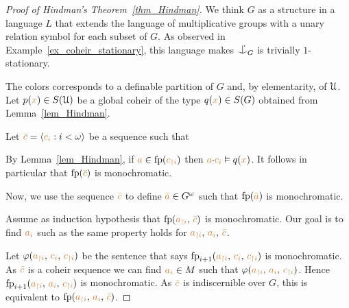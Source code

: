 \documentclass[creche.tex]{subfiles}
\begin{document}
\begin{proof}[Proof of Hindman's Theorem~\ref{thm_Hindman}]
We think $G$ as a structure in a language $L$ that extends the language of multiplicative groups with a unary relation symbol for each subset of $G$. As observed in Example~\ref{ex_coheir_stationary}, this language makes $\nonforkc_G$ is trivially $1$-stationary.

The colors corresponds to a definable partition of $G$ and, by elementarity, of $\EuScript U$.
Let $p({\color{brown} x})\in S(\EuScript U)$ be a global coheir of the type $q({\color{brown} x})\in S(G)$ obtained from Lemma~\ref{lem_Hindman}.

Let ${\color{brown}\bar c}=\langle{\color{brown}c_i}:i<\omega\rangle$ be a sequence such that


By Lemma~\ref{lem_Hindman}, if ${\color{brown} a}\in {\rm fp}({\color{brown} c_{\restriction i}})$ then ${\color{brown} a}{\cdot}{\color{brown} c_i}\vDash q({\color{brown} x})$.
It follows in particular that ${\rm fp}({\color{brown}\bar c})$ is monochromatic.


Now, we use the sequence ${\color{brown}\bar c}$ to define ${\color{brown}\bar a}\in G^\omega$ such that ${\rm fp}({\color{brown}\bar a})$ is monochromatic.

Assume as induction hypothesis that ${\rm fp}({\color{brown} a_{\restriction i}},\,{\color{brown}\bar c})$ is monochromatic.
Our goal is to find ${\color{brown} a_i}$ such as the same property holds for ${\color{brown} a_{\restriction i}},\,{\color{brown} a_i},\,{\color{brown}\bar c}$.


Let $\varphi({\color{brown} a_{\restriction i}},\,{\color{brown} c_i},\,{\color{brown} c_{\restriction i}})$ be the sentence that says ${\rm fp}_{i+1}({\color{brown} a_{\restriction i}},\,{\color{brown} c_i},\,{\color{brown} c_{\restriction i}})$ is monochromatic.
As ${\color{brown}\bar c}$ is a coheir sequence we can find  ${\color{brown} a_i}\in M$ such that $\varphi({\color{brown} a_{\restriction i}},\,{\color{brown} a_i},\,{\color{brown} c_{\restriction i}})$.
  Hence ${\rm fp}_{i+1}({\color{brown} a_{\restriction i}},\,{\color{brown} a_i},\,{\color{brown} c_{\restriction i}})$ is monochromatic.
 As ${\color{brown}\bar c}$ is indiscernible over $G$, this is equivalent to  ${\rm fp}({\color{brown} a_{\restriction i}},\,{\color{brown} a_i},\,{\color{brown}\bar c})$.
\end{proof}
\end{document}

